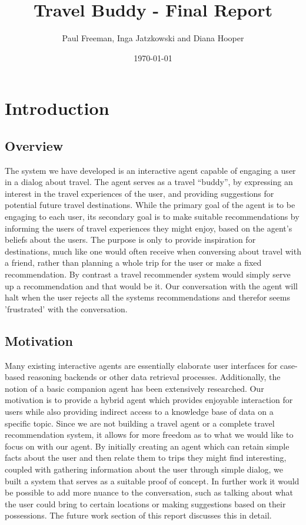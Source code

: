 \documentclass[11pt]{article} %
\title{Travel Buddy - Final Report}
\author{Paul Freeman, Inga Jatzkowski and Diana Hooper}
\date{\today } %
\begin{document}
\maketitle
\newpage
\tableofcontents
\newpage

\section{Introduction}
\subsection{Overview}
The system we have developed is an interactive agent capable of
engaging a user in a dialog about travel. 
The agent serves as a travel ``buddy'', by expressing an interest in the travel
experiences of the user, and providing suggestions for potential future travel destinations. 
While the primary goal of the agent is to be engaging to each user, its secondary goal is to make suitable recommendations by informing the users of travel experiences they might enjoy, based on the agent's beliefs about the users. 
The purpose is only to provide inspiration for destinations, much like one would often receive when conversing about travel with a friend, rather than planning a whole trip for the user or make a fixed recommendation. 
By contrast a travel recommender system would simply serve up a recommendation and that would be it. 
Our conversation with the agent will halt when the user rejects all the systems recommendations and therefor seems 'frustrated' with the conversation.

\subsection{Motivation}
Many existing interactive agents are essentially elaborate user
interfaces for case-based reasoning backends or other data retrieval
processes. 
Additionally, the notion of a basic companion agent has been
extensively researched. 
Our motivation is to provide a hybrid agent which provides enjoyable interaction for users while also providing indirect access to a knowledge base of data on a specific topic.
Since we are not building a travel agent or a complete travel recommendation system, it allows for more freedom as to what we would like to focus on with our agent. 
By initially creating an agent which can retain simple facts about the user and then relate them to trips they might find interesting, coupled with gathering information about the user through simple dialog, we built a system that serves as a suitable proof of concept. 
In further work it would be possible to add more nuance to the conversation, such as talking about what the user could bring to certain locations or making suggestions based on their possessions. 
The future work section of this report discusses this in detail.
\end{document}

